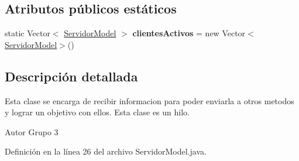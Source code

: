 \subsection*{Atributos públicos estáticos}
\begin{DoxyCompactItemize}
\item 
\hypertarget{classcom_1_1ucab_1_1javachat_1_1_servidor_1_1model_1_1_servidor_model_ab9706c2f3385f6220488155d97e530c1}{static Vector$<$ \hyperlink{classcom_1_1ucab_1_1javachat_1_1_servidor_1_1model_1_1_servidor_model}{Servidor\-Model} $>$ {\bfseries clientes\-Activos} = new Vector$<$\hyperlink{classcom_1_1ucab_1_1javachat_1_1_servidor_1_1model_1_1_servidor_model}{Servidor\-Model}$>$()}\label{classcom_1_1ucab_1_1javachat_1_1_servidor_1_1model_1_1_servidor_model_ab9706c2f3385f6220488155d97e530c1}

\end{DoxyCompactItemize}


\subsection{Descripción detallada}
Esta clase se encarga de recibir informacion para poder enviarla a otros metodos y lograr un objetivo con ellos. Esta clase es un hilo. \begin{DoxyAuthor}{Autor}
Grupo 3 
\end{DoxyAuthor}


Definición en la línea 26 del archivo Servidor\-Model.\-java.



